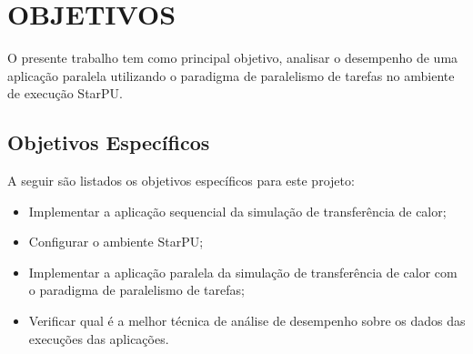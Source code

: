 
\chapter{OBJETIVOS}
\label{chap:objetivos}

O presente trabalho tem como principal objetivo, analisar o desempenho de uma aplicação paralela utilizando o paradigma de paralelismo de tarefas no ambiente de execução StarPU.

\section{Objetivos Específicos}

A seguir são listados os objetivos específicos para este projeto:\\

\begin{itemize}
    \item Implementar a aplicação sequencial da simulação de transferência de calor;
    \item Configurar o ambiente StarPU;
    \item Implementar a aplicação paralela da simulação de transferência de calor com o paradigma de paralelismo de tarefas;
    \item Verificar qual é a melhor técnica de análise de desempenho sobre os dados das execuções das aplicações.
\end{itemize}